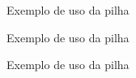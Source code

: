 

\begin{frame}[fragile]{Exemplo de uso da pilha}
\end{frame}

\begin{frame}[fragile]{Exemplo de uso da pilha}
\end{frame}

\begin{frame}[fragile]{Exemplo de uso da pilha}
\end{frame}
